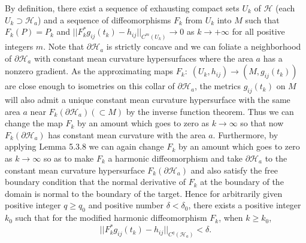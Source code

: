 By definition, there exist a sequence of exhausting compact sets
$U_k$ of $\mathcal{H}$ (each $U_k \supset \mathcal{H}_a$) and a
sequence of diffeomorphisms $F_k$ from $U_k$ into $M$ such that
$F_k(P)=P_k$ and
$||F^*_kg_{ij}(t_k)-h_{ij}||_{C^m(U_k)}\rightarrow 0$ as
$k\rightarrow+\infty$ for all positive integers $m$. Note that
$\partial \mathcal{H}_a$ is strictly concave and we can foliate a
neighborhood of $\partial \mathcal{H}_a$ with constant mean
curvature hypersurfaces where the area $a$ has a nonzero gradient.
As the approximating maps
$F_k:\;(U_k,h_{ij})\rightarrow(M,g_{ij}(t_k))$ are close enough to
isometries on this collar of $\partial \mathcal{H}_a$, the metrics
$g_{ij}(t_k)$ on $M$ will also admit a unique constant mean
curvature hypersurface with the same area $a$ near $F_k(\partial
\mathcal{H}_a)(\subset M)$ by the inverse function theorem. Thus
we can change the map $F_k$ by an amount which goes to zero as
$k\rightarrow\infty$ so that now $F_k(\partial \mathcal{H}_a)$ has
constant mean curvature with the area $a$. Furthermore, by
applying Lemma 5.3.8 we can again change $F_k$ by an amount which
goes to zero as $k\rightarrow\infty$ so as to make $F_k$ a
harmonic diffeomorphism and take $\partial \mathcal{H}_a$ to the
constant mean curvature hypersurface $F_k(\partial \mathcal{H}_a)$
and also satisfy the free boundary condition that the normal
derivative of $F_k$ at the boundary of the domain is normal to the
boundary of the target. Hence for arbitrarily given positive
integer $q\ge q_0$ and positive number $\delta<\delta_0$, there
exists a positive integer $k_0$ such that for the modified
harmonic diffeomorphism $F_k$, when $k\ge k_0$,
$$
||F^*_kg_{ij}(t_k)-h_{ij}||_{C^q(\mathcal{H}_a)}<\delta.
$$

